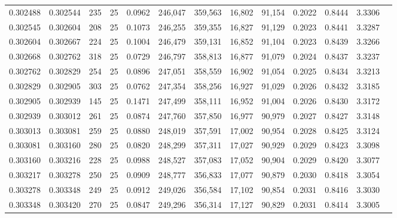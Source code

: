 \begin{tabular}{rrrrrrrrrrrrr}
0.302488 & 0.302544 &   235 &  25 &                                     0.0962 & 246,047 & 359,563 &  16,802 &  91,154 & 0.2022 & 0.8444 & 3.3306 \\
0.302545 & 0.302604 &   208 &  25 &                                     0.1073 & 246,255 & 359,355 &  16,827 &  91,129 & 0.2023 & 0.8441 & 3.3287 \\
0.302604 & 0.302667 &   224 &  25 &                                     0.1004 & 246,479 & 359,131 &  16,852 &  91,104 & 0.2023 & 0.8439 & 3.3266 \\
0.302668 & 0.302762 &   318 &  25 &                                     0.0729 & 246,797 & 358,813 &  16,877 &  91,079 & 0.2024 & 0.8437 & 3.3237 \\
0.302762 & 0.302829 &   254 &  25 &                                     0.0896 & 247,051 & 358,559 &  16,902 &  91,054 & 0.2025 & 0.8434 & 3.3213 \\
0.302829 & 0.302905 &   303 &  25 &                                     0.0762 & 247,354 & 358,256 &  16,927 &  91,029 & 0.2026 & 0.8432 & 3.3185 \\
0.302905 & 0.302939 &   145 &  25 &                                     0.1471 & 247,499 & 358,111 &  16,952 &  91,004 & 0.2026 & 0.8430 & 3.3172 \\
0.302939 & 0.303012 &   261 &  25 &                                     0.0874 & 247,760 & 357,850 &  16,977 &  90,979 & 0.2027 & 0.8427 & 3.3148 \\
0.303013 & 0.303081 &   259 &  25 &                                     0.0880 & 248,019 & 357,591 &  17,002 &  90,954 & 0.2028 & 0.8425 & 3.3124 \\
0.303081 & 0.303160 &   280 &  25 &                                     0.0820 & 248,299 & 357,311 &  17,027 &  90,929 & 0.2029 & 0.8423 & 3.3098 \\
0.303160 & 0.303216 &   228 &  25 &                                     0.0988 & 248,527 & 357,083 &  17,052 &  90,904 & 0.2029 & 0.8420 & 3.3077 \\
0.303217 & 0.303278 &   250 &  25 &                                     0.0909 & 248,777 & 356,833 &  17,077 &  90,879 & 0.2030 & 0.8418 & 3.3054 \\
0.303278 & 0.303348 &   249 &  25 &                                     0.0912 & 249,026 & 356,584 &  17,102 &  90,854 & 0.2031 & 0.8416 & 3.3030 \\
0.303348 & 0.303420 &   270 &  25 &                                     0.0847 & 249,296 & 356,314 &  17,127 &  90,829 & 0.2031 & 0.8414 & 3.3005 \\

\end{tabular}
